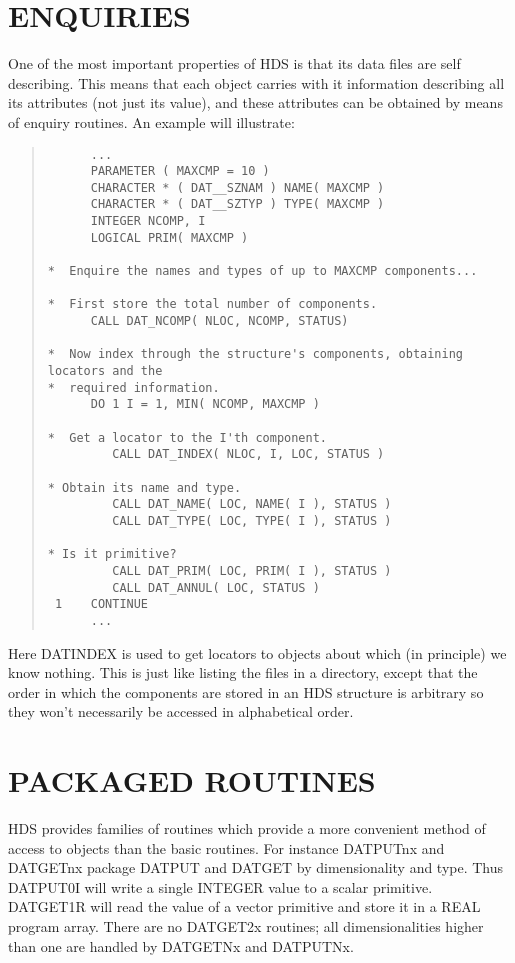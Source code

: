 \documentclass[twoside,11pt]{article}
\newcommand{\htmlref}[2]{#1}
\newcommand{\xlabel}[1]{}
\renewcommand{\_}{\texttt{\symbol{95}}}
\begin{document}
\section{\xlabel{enquiries}ENQUIRIES}

One of the most important properties of HDS is that its data files are
self describing. This means that each object carries with it
information describing all its attributes (not just its value), and
these attributes can be obtained by means of enquiry routines. An
example will illustrate:

\small
\begin{quote}
\begin{verbatim}
      ...
      PARAMETER ( MAXCMP = 10 )
      CHARACTER * ( DAT__SZNAM ) NAME( MAXCMP )
      CHARACTER * ( DAT__SZTYP ) TYPE( MAXCMP )
      INTEGER NCOMP, I
      LOGICAL PRIM( MAXCMP )

*  Enquire the names and types of up to MAXCMP components...

*  First store the total number of components.
      CALL DAT_NCOMP( NLOC, NCOMP, STATUS)

*  Now index through the structure's components, obtaining locators and the
*  required information.
      DO 1 I = 1, MIN( NCOMP, MAXCMP )

*  Get a locator to the I'th component.
         CALL DAT_INDEX( NLOC, I, LOC, STATUS )

* Obtain its name and type.
         CALL DAT_NAME( LOC, NAME( I ), STATUS )
         CALL DAT_TYPE( LOC, TYPE( I ), STATUS )

* Is it primitive?
         CALL DAT_PRIM( LOC, PRIM( I ), STATUS )
         CALL DAT_ANNUL( LOC, STATUS )
 1    CONTINUE
      ...
\end{verbatim}
\end{quote}
\normalsize

Here \htmlref{DAT\_INDEX}{DAT_INDEX} is used to get \htmlref{locators}{sect:locators} to
objects about which (in principle) we know nothing. This is just like
listing the files in a directory, except that the order in which the
components are stored in an HDS structure is arbitrary so they won't
necessarily be accessed in alphabetical order.

\section{\xlabel{packaged_routines}PACKAGED ROUTINES}

HDS provides families of routines which provide a more convenient
method of access to objects than the basic routines. For instance
DAT\_PUTnx and DAT\_GETnx package \htmlref{DAT\_PUT}{DAT_PUT} and
\htmlref{DAT\_GET}{DAT_GET} by dimensionality and
\htmlref{type}{sect:type}. Thus \htmlref{DAT\_PUT0I}{DAT_PUT0x} will
write a single INTEGER value to a scalar
primitive. \htmlref{DAT\_GET1R}{DAT_GET1x} will read the value of a
vector primitive and store it in a REAL program array. There are no
DAT\_GET2x routines; all dimensionalities higher than one are handled
by \htmlref{DAT\_GETNx}{DAT_GETNx} and
\htmlref{DAT\_PUTNx}{DAT_PUTNx}.
\end{document}
